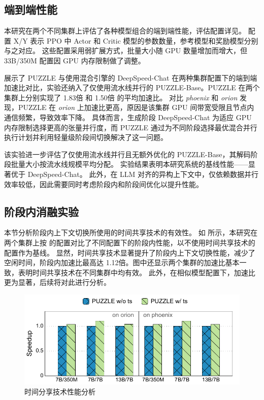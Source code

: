 \subsection{端到端性能}  

本研究在两个不同集群上评估了各种模型组合的端到端性能，评估配置详见。
配置 X/Y 表示 PPO 中 Actor 和 Critic 模型的参数数量，参考模型和奖励模型分别与之对应。
这些配置采用弱扩展方式，批量大小随 GPU 数量增加而增大，但 33B/350M 配置因 GPU 内存限制做了调整。  

 展示了 PUZZLE 与使用混合引擎的 DeepSpeed-Chat 在两种集群配置下的端到端加速比对比，实验还纳入了仅使用流水线并行的 PUZZLE-Base。PUZZLE 在两个集群上分别实现了 1.83倍 和 1.50倍 的平均加速比。
对比 \textit{phoenix} 和 \textit{orion} 发现，PUZZLE 在 \textit{orion} 上加速比更高，原因是该集群 GPU 间带宽受限且节点内通信频繁，导致效率下降。
具体而言，生成阶段 DeepSpeed-Chat 为适应 GPU 内存限制选择更高的张量并行度，而 PUZZLE 通过为不同阶段选择最优混合并行执行计划并利用轻量级阶段间切换解决了这一问题。  

该实验进一步评估了仅使用流水线并行且无额外优化的 PUZZLE-Base，其解码阶段批量大小按流水线规模平均分配。
实验结果表明本研究系统的基线性能——显著优于 DeepSpeed-Chat。
此外，在 LLM 对齐的异构上下文中，仅依赖数据并行效率较低，因此需要同时考虑阶段内和阶段间优化以提升性能。  


\subsection{阶段内消融实验}  

本节分析阶段内上下文切换所使用的时间共享技术的有效性。
如 所示，本研究在两个集群上按 的配置对比了不同配置下的阶段内性能，以不使用时间共享技术的配置作为基线。
显然，时间共享技术显著提升了阶段内上下文切换性能，减少了空闲时间，阶段内加速比最高达 1.12倍。图中还显示两个集群的加速比基本一致，表明时间共享技术在不同集群中均有效。
此外，在相似模型配置下，加速比更为显著，后续将对此进行分析。  

\begin{figure}[h]
     \centering
     \includegraphics[width=0.65\linewidth]{figures/puzzle/intra-stage-ablation-study.pdf}
     \caption{时间分享技术性能分析} 
     \label{fig:intra-stage-ablation-study}
\end{figure}


